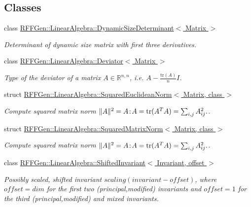 \subsection*{Classes}
\begin{DoxyCompactItemize}
\item 
class \hyperlink{classRFFGen_1_1LinearAlgebra_1_1DynamicSizeDeterminant}{R\-F\-F\-Gen\-::\-Linear\-Algebra\-::\-Dynamic\-Size\-Determinant$<$ Matrix $>$}
\begin{DoxyCompactList}\small\item\em Determinant of dynamic size matrix with first three derivatives. \end{DoxyCompactList}\item 
class \hyperlink{classRFFGen_1_1LinearAlgebra_1_1Deviator}{R\-F\-F\-Gen\-::\-Linear\-Algebra\-::\-Deviator$<$ Matrix $>$}
\begin{DoxyCompactList}\small\item\em Type of the deviator of a matrix $ A\in\mathbb{R}^{n,n} $, i.\-e. $ A - \frac{\mathrm{tr}(A)}{n}I $. \end{DoxyCompactList}\item 
struct \hyperlink{structRFFGen_1_1LinearAlgebra_1_1SquaredEuclideanNorm}{R\-F\-F\-Gen\-::\-Linear\-Algebra\-::\-Squared\-Euclidean\-Norm$<$ Matrix, class $>$}
\begin{DoxyCompactList}\small\item\em Compute squared matrix norm $ \|A\|^2 = A\negthinspace : \negthinspace A = \mathrm{tr}(A^TA) = \sum_{i,j} A_{ij}^2. $. \end{DoxyCompactList}\item 
struct \hyperlink{structRFFGen_1_1LinearAlgebra_1_1SquaredMatrixNorm}{R\-F\-F\-Gen\-::\-Linear\-Algebra\-::\-Squared\-Matrix\-Norm$<$ Matrix, class $>$}
\begin{DoxyCompactList}\small\item\em Compute squared matrix norm $ \|A\|^2 = A\negthinspace : \negthinspace A = \mathrm{tr}(A^TA) = \sum_{i,j} A_{ij}^2. $. \end{DoxyCompactList}\item 
class \hyperlink{classRFFGen_1_1LinearAlgebra_1_1ShiftedInvariant}{R\-F\-F\-Gen\-::\-Linear\-Algebra\-::\-Shifted\-Invariant$<$ Invariant, offset $>$}
\begin{DoxyCompactList}\small\item\em Possibly scaled, shifted invariant $scaling (invariant - offset)$, where $offset = dim$ for the first two (principal,modified) invariants and $offset = 1$ for the third (principal,modified) and mixed invariants. \end{DoxyCompactList}\item 

\end{DoxyCompactItemize}
